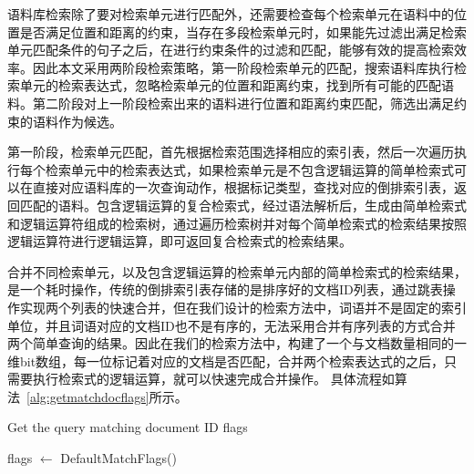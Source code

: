 \documentclass[11pt]{article}
\begin{document}
\begin{CJK*}{UTF8}{gbsn}
语料库检索除了要对检索单元进行匹配外，还需要检查每个检索单元在语料中的位置是否满足位置和距离的约束，当存在多段检索单元时，如果能先过滤出满足检索单元匹配条件的句子之后，在进行约束条件的过滤和匹配，能够有效的提高检索效率。因此本文采用两阶段检索策略，第一阶段检索单元的匹配，搜索语料库执行检索单元的检索表达式，忽略检索单元的位置和距离约束，找到所有可能的匹配语料。第二阶段对上一阶段检索出来的语料进行位置和距离约束匹配，筛选出满足约束的语料作为候选。

第一阶段，检索单元匹配，首先根据检索范围选择相应的索引表，然后一次遍历执行每个检索单元中的检索表达式，如果检索单元是不包含逻辑运算的简单检索式可以在直接对应语料库的一次查询动作，根据标记类型，查找对应的倒排索引表，返回匹配的语料。包含逻辑运算的复合检索式，经过语法解析后，生成由简单检索式和逻辑运算符组成的检索树，通过遍历检索树并对每个简单检索式的检索结果按照逻辑运算符进行逻辑运算，即可返回复合检索式的检索结果。

合并不同检索单元，以及包含逻辑运算的检索单元内部的简单检索式的检索结果，是一个耗时操作，传统的倒排索引表存储的是排序好的文档ID列表，通过跳表操作实现两个列表的快速合并，但在我们设计的检索方法中，词语并不是固定的索引单位，并且词语对应的文档ID也不是有序的，无法采用合并有序列表的方式合并两个简单查询的结果。因此在我们的检索方法中，构建了一个与文档数量相同的一维bit数组，每一位标记着对应的文档是否匹配，合并两个检索表达式的之后，只需要执行检索式的逻辑运算，就可以快速完成合并操作。 
具体流程如算法~\ref{alg:getmatchdocflags}所示。

\begin{algorithm}[H]
	\caption{Get the query matching document ID flags}
	\label{alg:getmatchdocflags}
	\DontPrintSemicolon
	
		
	
	\;
flags $\leftarrow$ DefaultMatchFlags()\;
	

\end{algorithm}
\end{CJK*}
\end{document}

